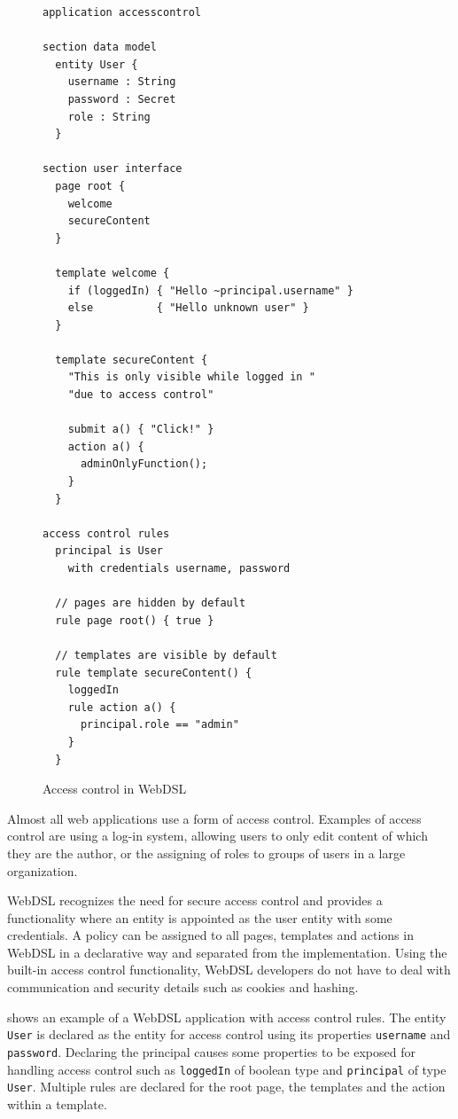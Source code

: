     \begin{figure}
      \begin{verbatim}
application accesscontrol

section data model
  entity User {
    username : String
    password : Secret
    role : String
  }

section user interface
  page root {
    welcome
    secureContent
  }

  template welcome {
    if (loggedIn) { "Hello ~principal.username" }
    else          { "Hello unknown user" }
  }

  template secureContent {
    "This is only visible while logged in "
    "due to access control"

    submit a() { "Click!" }
    action a() {
      adminOnlyFunction();
    }
  }

access control rules
  principal is User 
    with credentials username, password

  // pages are hidden by default
  rule page root() { true }

  // templates are visible by default
  rule template secureContent() {
    loggedIn
    rule action a() {
      principal.role == "admin"
    }
  }
      \end{verbatim}
      \caption{\label{fig:webdsl-access-control}Access control in WebDSL}
    \end{figure}

    Almost all web applications use a form of access control. Examples of access control are using a log-in system, allowing users to only edit content of which they are the author, or the assigning of roles to groups of users in a large organization.

    WebDSL recognizes the need for secure access control and provides a functionality where an entity is appointed as the user entity with some credentials. A policy can be assigned to all pages, templates and actions in WebDSL in a declarative way and separated from the implementation. Using the built-in access control functionality, WebDSL developers do not have to deal with communication and security details such as cookies and hashing.

     shows an example of a WebDSL application with access control rules. The entity \texttt{User} is declared as the entity for access control using its properties \texttt{username} and \texttt{password}. Declaring the principal causes some properties to be exposed for handling access control such as \texttt{loggedIn} of boolean type and \texttt{principal} of type \texttt{User}. Multiple rules are declared for the root page, the templates and the action within a template.

